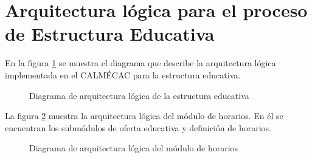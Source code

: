 \section{Arquitectura lógica para el proceso de Estructura Educativa}

En la figura \ref{fig:arquitecturaEE} se muestra el diagrama que describe la arquitectura lógica implementada en el CALMÉCAC para la estructura educativa.

\begin{figure}[htbp]
	\begin{center}
		\caption{Diagrama de arquitectura lógica de la estructura educativa}
		\label{fig:arquitecturaEE}
	\end{center}
\end{figure}

La figura \ref{fig:arquitecturaAL-MHR} muestra la arquitectura lógica del módulo de horarios. En él se encuentran los submódulos de oferta educativa y definición de horarios.

\begin{figure}[htbp]
	\begin{center}
		\caption{Diagrama de arquitectura lógica del módulo de horarios}
		\label{fig:arquitecturaAL-MHR}
	\end{center}
\end{figure}

